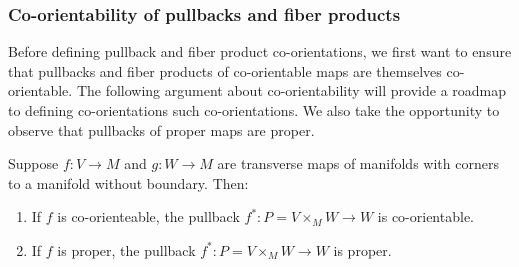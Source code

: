 \begin{comment}
	BCOMMENT
	\red{Again, isn't the point that we don't know $\gamma$, so how can we fix the diagram to commute and then use that to determine $\gamma$? I think the idea is that we really need to say that the first diagram somehow determines this diagram via some conventions (what are those?).
		Then we know what the maps on the right are because that's just the tensor product of co-orientations of $V$ and $W$.
		On the left we know $i$ since that's canonical somehow (we still need to look up a good reference for that), and then all these other things determine a unique $\gamma$ so that the diagram commutes.
		This $\gamma$ is our co-orientation for $P$.
		So I think this all needs to be clarified.}
	Any such set of choices then yields
	a definition of pullback co-orientation through a diagram chase.
	In concrete terms, fix a local orientation $\beta_M$ of $M$, and then
	use the co-orientations of $f$ and $g$ to identify compatible local orientations $\beta_V$ of $V$ and $\beta_W$ of $W$.
	A fixed identification
	of the normal bundle of $\Delta M$ with the tangent bundle of $M$ then gives a $\beta_{\nu P \subset V \times W}$ which corresponds to $\beta_M$.
	The pullback co-orientation of the map $P \to M$ can then be defined pair $\beta_M$ with a
	local orientation $\beta_P$ of $P$ so that $\beta_P \otimes \beta_{\nu P \subset V \times W}$ maps to $\beta_V \otimes \beta_W$ under
	the top horizontal isomorphism of Equation~\ref{co-or stuff}.
	ECOMMENT

	In order to obtain these properties we will develop additional structure to control the
	isomorphisms in Diagram~\eqref{co-or stuff}.
	We do this first by working at the level of vector spaces and linear maps over a point before expanding to local definitions and then
	back to the global level.
\end{comment}

\subsubsection{Co-orientability of pullbacks and fiber products}

Before defining pullback and fiber product co-orientations, we first want to ensure that pullbacks and fiber products of co-orientable maps are themselves co-orientable.
The following argument about co-orientability will provide a roadmap to defining co-orientations such co-orientations.
We also take the opportunity to observe that pullbacks of proper maps are proper.

\begin{lemma}\label{L: co-orientable pullback}
	Suppose $f \colon V \to M$ and $g \colon W \to M$ are transverse maps of manifolds with corners to a manifold without boundary.
	Then:
	\begin{enumerate}
		\item If $f$ is co-orienteable, the pullback $f^*:P=V\times_MW\to W$ is co-orientable.

		\item If $f$ is proper, the pullback $f^*:P=V\times_MW\to W$ is proper.
	\end{enumerate}
\end{lemma}


